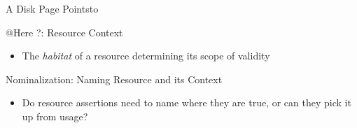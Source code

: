 \documentclass[aspectratio=169,xcolor=dvipsnames]{beamer}
\begin{document}
\begin{frame}{A Disk Page Pointsto}
\begin{figure}
\begin{tikzpicture}[x=0.75pt,y=0.75pt,yscale=-0.75,xscale=0.75]
\end{tikzpicture}
             \end{figure}
\end{frame}
\begin{frame}{@Here ?: Resource Context}
\begin{itemize}
    \item     The \emph{habitat} of a resource determining its scope of validity
\end{itemize}
\end{frame}

\begin{frame}{Nominalization: Naming Resource and its Context}
    \begin{itemize}
        \item Do resource assertions need to name where they are true, or can they pick it up from usage?
    \end{itemize}
\end{frame}
\end{document}
